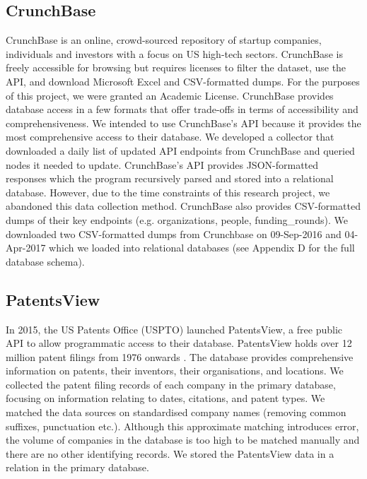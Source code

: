 \documentclass[../thesis/thesis.tex]{subfiles}
\begin{document}
\subsection{CrunchBase}

CrunchBase is an online, crowd-sourced repository of startup companies, individuals and investors with a focus on US high-tech sectors. CrunchBase is freely accessible for browsing but requires licenses to filter the dataset, use the API, and download Microsoft Excel and CSV-formatted dumps. For the purposes of this project, we were granted an Academic License. CrunchBase provides database access in a few formats that offer trade-offs in terms of accessibility and comprehensiveness. We intended to use CrunchBase’s API because it provides the most comprehensive access to their database. We developed a collector that downloaded a daily list of updated API endpoints from CrunchBase and queried nodes it needed to update. CrunchBase’s API provides JSON-formatted responses which the program recursively parsed and stored into a relational database. However, due to the time constraints of this research project, we abandoned this data collection method. CrunchBase also provides CSV-formatted dumps of their key endpoints (e.g. organizations, people, funding\_rounds). We downloaded two CSV-formatted dumps from Crunchbase on 09-Sep-2016 and 04-Apr-2017 which we loaded into relational databases (see Appendix D for the full database schema).

\subsection{PatentsView}

In 2015, the US Patents Office (USPTO) launched PatentsView, a free public API to allow programmatic access to their database. PatentsView holds over 12 million patent filings from 1976 onwards \cite{schultz2016}. The database provides comprehensive information on patents, their inventors, their organisations, and locations. We collected the patent filing records of each company in the primary database, focusing on information relating to dates, citations, and patent types. We matched the data sources on standardised company names (removing common suffixes, punctuation etc.). Although this approximate matching introduces error, the volume of companies in the database is too high to be matched manually and there are no other identifying records. We stored the PatentsView data in a relation in the primary database.
\end{document}
